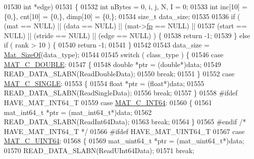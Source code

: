 \begin{DoxyCode}
{{{{{01530     \textcolor{keywordtype}{int} *edge)
01531 \{
01532     \textcolor{keywordtype}{int} nBytes = 0, i, j, N, I = 0;
01533     \textcolor{keywordtype}{int} inc[10] = \{0,\}, cnt[10] = \{0,\}, dimp[10] = \{0,\};
01534     \textcolor{keywordtype}{size\_t} data\_size;
01535 
01536     \textcolor{keywordflow}{if} ( (mat   == NULL) || (data   == NULL) || (mat->\hyperlink{struct__mat__t_a85f562e407ca9ad4d2a6e14f839432b7}{fp} == NULL) ||
01537          (start == NULL) || (stride == NULL) || (edge    == NULL) ) \{
01538         \textcolor{keywordflow}{return} -1;
01539     \} \textcolor{keywordflow}{else} \textcolor{keywordflow}{if} ( rank > 10 ) \{
01540         \textcolor{keywordflow}{return} -1;
01541     \}
01542 
01543     data\_size = \hyperlink{group__mat__util_gab6774aabdc124c540c1e7686d0804940}{Mat\_SizeOf}(data\_type);
01544 
01545     \textcolor{keywordflow}{switch} ( class\_type ) \{
01546         \textcolor{keywordflow}{case} \hyperlink{group___m_a_t_ggad4d60ae7b709fc81bfd744fb4c857c40a5d70e0862e5bdb7bd86bf7ba5948f307}{MAT\_C\_DOUBLE}:
01547         \{
01548             \textcolor{keywordtype}{double} *ptr = (\textcolor{keywordtype}{double}*)data;
01549             READ\_DATA\_SLABN(ReadDoubleData);
01550             \textcolor{keywordflow}{break};
01551         \}
01552         \textcolor{keywordflow}{case} \hyperlink{group___m_a_t_ggad4d60ae7b709fc81bfd744fb4c857c40a2825631e26a961cbe0f79db50a39cea2}{MAT\_C\_SINGLE}:
01553         \{
01554             \textcolor{keywordtype}{float} *ptr = (\textcolor{keywordtype}{float}*)data;
01555             READ\_DATA\_SLABN(ReadSingleData);
01556             \textcolor{keywordflow}{break};
01557         \}
01558 \textcolor{preprocessor}{#ifdef HAVE\_MAT\_INT64\_T}
01559         \textcolor{keywordflow}{case} \hyperlink{group___m_a_t_ggad4d60ae7b709fc81bfd744fb4c857c40a1ea83bcde49b35477494412973f82409}{MAT\_C\_INT64}:
01560         \{
01561             mat\_int64\_t *ptr = (mat\_int64\_t*)data;
01562             READ\_DATA\_SLABN(ReadInt64Data);
01563             \textcolor{keywordflow}{break};
01564         \}
01565 \textcolor{preprocessor}{#endif }\textcolor{comment}{/* HAVE\_MAT\_INT64\_T */}\textcolor{preprocessor}{}
01566 \textcolor{preprocessor}{#ifdef HAVE\_MAT\_UINT64\_T}
01567         \textcolor{keywordflow}{case} \hyperlink{group___m_a_t_ggad4d60ae7b709fc81bfd744fb4c857c40a86470e25c3763d9a24623f04326195dd}{MAT\_C\_UINT64}:
01568         \{
01569             mat\_uint64\_t *ptr = (mat\_uint64\_t*)data;
01570             READ\_DATA\_SLABN(ReadUInt64Data);
01571             \textcolor{keywordflow}{break};
}}}}}
\end{DoxyCode}
